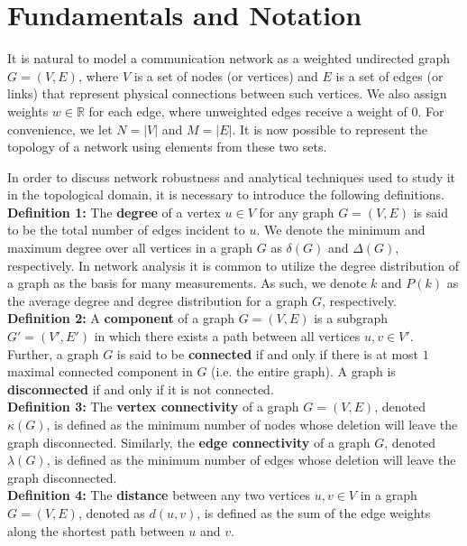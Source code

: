 \documentclass[doc]{apa}%
\begin{document}
\section{Fundamentals and Notation}
\label{Definitions}

It is natural to model a communication network as a weighted undirected graph $G = (V,E)$, where $V$ is a set of nodes (or vertices) and $E$ is a set of edges (or links) that represent physical connections between such vertices. We also assign weights $w \in \mathbb{R}$ for each edge, where unweighted edges receive a weight of $0$. For convenience, we let $N = |V|$ and $M = |E|$. It is now possible to represent the topology of a network using elements from these two sets. 

In order to discuss network robustness and analytical techniques used to study it in the topological domain, it is necessary to introduce the following definitions. \\

\textbf{Definition 1:}
The \textbf{degree} of a vertex $u \in V$ for any graph $G = (V,E)$ is said to be the total number of edges incident to $u$. We denote the minimum and maximum degree over all vertices in a graph $G$ as $\delta(G)$ and $\Delta(G)$, respectively. In network analysis it is common to utilize the degree distribution of a graph as the basis for many measurements. As such, we denote $k$ and $P(k)$ as the average degree  and degree distribution for a graph $G$, respectively.\\

\textbf{Definition 2:}
A \textbf{component} of a graph $G = (V,E)$ is a subgraph $G' = (V',E')$ in which there exists a path between all vertices $u, v \in V'$. Further, a graph $G$ is said to be \textbf{connected} if and only if there is at most $1$ maximal connected component in $G$ (i.e. the entire graph). A graph is \textbf{disconnected} if and only if it is not connected. \\

\textbf{Definition 3:}
The \textbf{vertex connectivity} of a graph $G = (V,E)$, denoted $\kappa(G)$, is defined as the minimum number of nodes whose deletion will leave the graph disconnected. Similarly, the \textbf{edge connectivity} of a graph $G$, denoted $\lambda(G)$, is defined as the minimum number of edges whose deletion will leave the graph disconnected.\\

\textbf{Definition 4:}
The \textbf{distance} between any two vertices $u, v \in V$ in a graph $G = (V,E)$, denoted as $d(u,v)$, is defined as the sum of the edge weights along the shortest path between $u$ and $v$.
\end{document}
